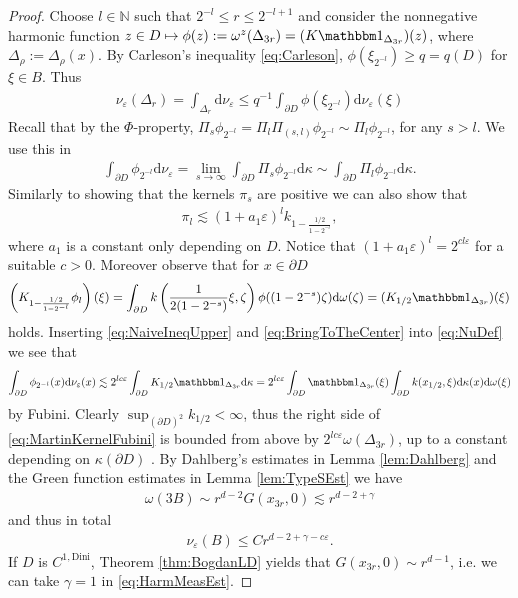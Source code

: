 \documentclass[a4paper,12pt]{article}
\theoremstyle{definition}
\theoremstyle{definition}
\begin{document}
	\begin{proof}
		Choose $l\in\mathbb N$ such that $2^{-l}\leq r\leq2^{-l+1}$ and consider the nonnegative harmonic function $z\in D\mapsto \phi(z):=\omega^z(\Delta_{3r})=(K\mathbbm1_{\Delta_{3r}})(z)$, where $\Delta_\rho:=\Delta_\rho(x)$. By Carleson's inequality \eqref{eq:Carleson}, $\phi(\xi_{2^{-l}})\geq q=q(D)$ for $\xi\in B$. Thus 
		\begin{align*}
			\nu_\varepsilon(\Delta_r)=\int_{\Delta_r}\mathrm{d}\nu_{\varepsilon}\leq q^{-1}\int_{\partial D}\phi(\xi_{2^{-l}})\mathrm d\nu_{\varepsilon}(\xi)
		\end{align*}
		Recall that by the $\Phi$-property, $\Pi_s\phi_{2^{-l}}=\Pi_l\Pi_{(s,l)}\phi_{2^{-l}}\sim\Pi_l\phi_{2^{-l}}$,  for any $s>l$. We use this in
		\begin{align}\label{eq:NuDef}
			\int_{\partial D}\phi_{2^{-l}}\mathrm d\nu_{\varepsilon}=\lim_{s\rightarrow\infty}\int_{\partial D}\Pi_s\phi_{2^{-l}}\mathrm d\kappa\sim\int_{\partial D} \Pi_l\phi_{2^{-l}}\mathrm d\kappa.
		\end{align}
		Similarly to showing that the kernels $\pi_s$ are positive we can also show that
		\begin{align}\label{eq:NaiveIneqUpper}
			\pi_{l}\lesssim(1+a_1\varepsilon)^l k_{1-\frac{1/2}{1-2^{-l}}},
		\end{align}
		where $a_1$ is a constant only depending on $D$. Notice that $(1+a_1\varepsilon)^l=2^{cl\varepsilon}$ for a suitable $c>0$. Moreover observe that for $x\in\partial D$
		\begin{align}\label{eq:BringToTheCenter}
			\left(K_{1-\frac{1/2}{1-2^{-l}}}\phi_l\right)(\xi)=\int_{\partial D}k\left(\frac{1}{2(1-2^{-s})}\xi,\zeta\right)\phi((1-2^{-s})\zeta)\mathrm d\omega(\zeta)=(K_{1/2}\mathbbm1_{\Delta_{3r}})(\xi)
		\end{align}
		holds. Inserting \eqref{eq:NaiveIneqUpper} and \eqref{eq:BringToTheCenter} into \eqref{eq:NuDef} we see that
		\begin{align}\label{eq:MartinKernelFubini}
				\int_{\partial D}\phi_{2^{-l}}(x)\mathrm d\nu_{\varepsilon}(x)\lesssim 2^{lc\varepsilon}\int_{\partial D}K_{1/2}\mathbbm1_{\Delta_{3r}}\mathrm d\kappa = 2^{lc\varepsilon}\int_{\partial D}\mathbbm1_{\Delta_{3r}}(\xi)\int_{\partial D}k(x_{1/2},\xi)\mathrm{d}\kappa(x)\mathrm d\omega(\xi) 
		\end{align}
		by Fubini. Clearly $\sup_{(\partial D)^2}k_{1/2}<\infty$, thus the right side of \eqref{eq:MartinKernelFubini} is bounded from above by $2^{lc\varepsilon}\omega(\Delta_{3r})$, up to a constant depending on $\kappa(\partial D)$ . By Dahlberg's estimates in Lemma \ref{lem:Dahlberg} and the Green function estimates in Lemma \ref{lem:TypeSEst} we have
		\begin{align}\label{eq:HarmMeasEst}
			\omega(3B)\sim r^{d-2}G(x_{3r},0)\lesssim r^{d-2+\gamma}
		\end{align}
		and thus in total 
		\begin{align*}
			\nu_{\varepsilon}(B)\leq C r^{d-2+\gamma-c\varepsilon}.
		\end{align*}
		If $D$ is $C^{1,\mathrm{Dini}}$, Theorem \ref{thm:BogdanLD} yields that $G(x_{3r},0)\sim r^{d-1}$, i.e. we can take $\gamma=1$ in \eqref{eq:HarmMeasEst}.
	\end{proof}
\end{document}
